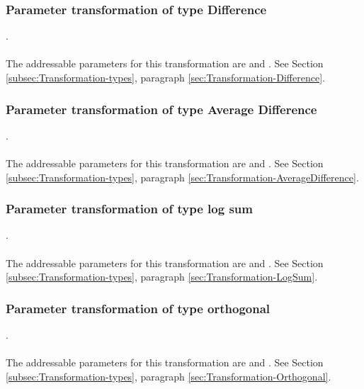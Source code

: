 \subsubsection{Parameter transformation of type Difference}
.
\label{syntax:Transformation-Difference} \\ \\
The addressable parameters for this transformation are  and . See Section \ref{subsec:Transformation-types}, paragraph \ref{sec:Transformation-Difference}.

\subsubsection{Parameter transformation of type Average Difference}
.
\label{syntax:Transformation-AverageDifference} \\ \\
The addressable parameters for this transformation are  and . See Section \ref{subsec:Transformation-types}, paragraph \ref{sec:Transformation-AverageDifference}.

\subsubsection{Parameter transformation of type log sum}
.
\label{syntax:Transformation-LogSum} \\ \\
The addressable parameters for this transformation are  and . See Section \ref{subsec:Transformation-types}, paragraph \ref{sec:Transformation-LogSum}.

\subsubsection{Parameter transformation of type orthogonal}
.
\label{syntax:Transformation-Orthogonal} \\ \\
The addressable parameters for this transformation are  and . See Section \ref{subsec:Transformation-types}, paragraph \ref{sec:Transformation-Orthogonal}.

